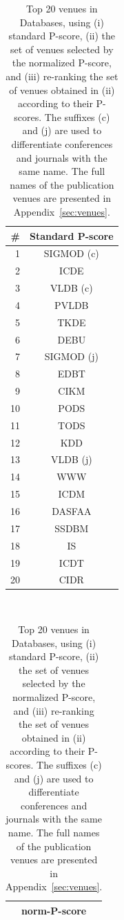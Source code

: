\documentclass[msc]{ppgccufmg}
\begin{document}
\begin{table}[htbp]
\centering
\caption{Top 20 venues in Databases, using (i) standard P-score, (ii) the set of venues selected by the normalized P-score, and (iii) re-ranking the set of venues obtained in (ii) according to their P-scores. The suffixes (c) and (j) are used to differentiate conferences and journals with the same name.  The full names of the publication venues are presented in Appendix~\ref{sec:venues}.}
\label{tab:db-venues}
\begin{tabular}{rc}
\toprule
\#		&	Standard P-score \\ 
\midrule
1		&		SIGMOD (c)	\\
2		&		ICDE		\\
3		&		VLDB (c)	\\
4		&		PVLDB		\\
5		&		TKDE		\\
6		&		DEBU		\\
7		&		SIGMOD (j)	\\
8		&		EDBT		\\
9		&		CIKM		\\
10		&		PODS		\\
11		&		TODS		\\
12		&		KDD			\\
13		&		VLDB (j)	\\
14		&		WWW			\\
15		&		ICDM		\\
16		&		DASFAA		\\
17		&		SSDBM		\\
18		&		IS			\\
19		&		ICDT		\\
20		&		CIDR		\\
\bottomrule
\end{tabular} \ \ 
\begin{tabular}{c}
\toprule
norm-P-score \\ 
\midrule

\end{tabular}
\end{table}
\end{document}
